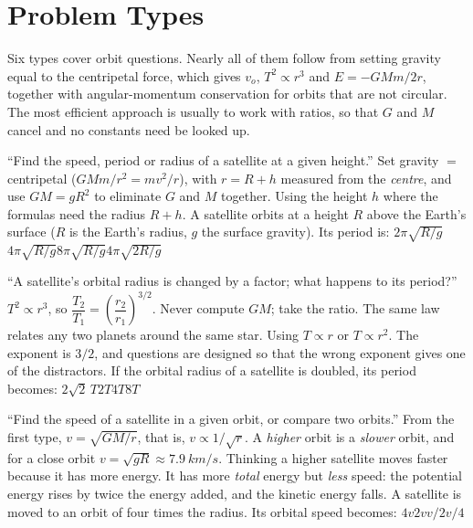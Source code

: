 \section{Problem Types}\label{sec:types17}
Six types cover orbit questions. Nearly all of them follow from setting gravity equal to the centripetal
force, which gives $v_o$, $T^2\propto r^3$ and $E=-GMm/2r$, together with angular-momentum conservation for
orbits that are not circular. The most efficient approach is usually to work with ratios, so that $G$ and
$M$ cancel and no constants need be looked up.

{``Find the speed, period or radius of a satellite at a given height.''}
{Set gravity $=$ centripetal ($GMm/r^2=mv^2/r$), with $r=R+h$ measured from the \emph{centre}, and use
$GM=gR^2$ to eliminate $G$ and $M$ together.}
{Using the height $h$ where the formulas need the radius $R+h$.}
{A satellite orbits at a height $R$ above the Earth's surface ($R$ is the Earth's radius, $g$ the surface
gravity). Its period is:}
{$2\pi\sqrt{R/g}$}{$4\pi\sqrt{R/g}$}{$8\pi\sqrt{R/g}$}{$4\pi\sqrt{2R/g}$}

{``A satellite's orbital radius is changed by a factor; what happens to its period?''}
{$T^2\propto r^3$, so $\dfrac{T_2}{T_1}=\left(\dfrac{r_2}{r_1}\right)^{3/2}$. Never compute $GM$; take
the ratio. The same law relates any two planets around the same star.}
{Using $T\propto r$ or $T\propto r^2$. The exponent is $3/2$, and questions are designed so that the
wrong exponent gives one of the distractors.}
{If the orbital radius of a satellite is doubled, its period becomes:}
{$2\sqrt2\,T$}{$2T$}{$4T$}{$8T$}

{``Find the speed of a satellite in a given orbit, or compare two orbits.''}
{From the first type, $\boxed{v=\sqrt{GM/r}}$, that is, $v\propto1/\sqrt r$. A \emph{higher} orbit is a \emph{slower}
orbit, and for a close orbit $v=\sqrt{gR}\approx\SI{7.9}{km/s}$.}
{Thinking a higher satellite moves faster because it has more energy. It has more \emph{total} energy but
\emph{less} speed: the potential energy rises by twice the energy added, and the kinetic energy falls.}
{A satellite is moved to an orbit of four times the radius. Its orbital speed becomes:}
{$4v$}{$2v$}{$v/2$}{$v/4$}

